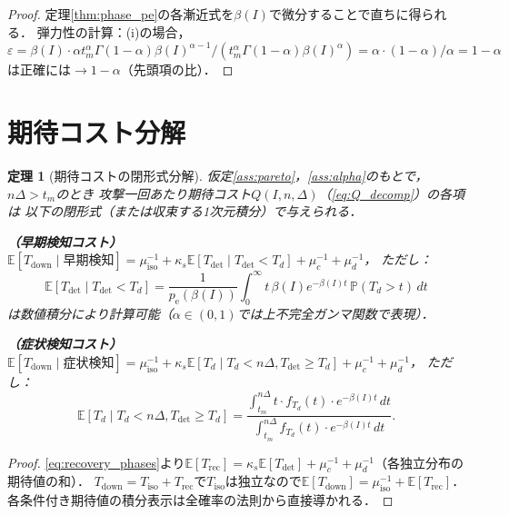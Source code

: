 \documentclass[12pt,a4paper]{article}
\theoremstyle{plain}
\newtheorem{theorem}{定理}[section]
\theoremstyle{definition}
\theoremstyle{remark}
\newcommand{\E}{\mathbb{E}}
\newcommand{\Prob}{\mathbb{P}}
\newcommand{\pe}{p_{\mathrm{e}}}
\newcommand{\Tdet}{T_{\mathrm{det}}}
\newcommand{\Trec}{T_{\mathrm{rec}}}
\newcommand{\Tdown}{T_{\mathrm{down}}}
\newcommand{\betaI}{\beta(I)}
\begin{document}
\begin{proof}
定理\ref{thm:phase_pe}の各漸近式を$\betaI$で微分することで直ちに得られる．
弾力性の計算：(i)の場合，
$\varepsilon=\betaI\cdot\alpha t_m^\alpha\Gamma(1-\alpha)\betaI^{\alpha-1}/(t_m^\alpha\Gamma(1-\alpha)\betaI^\alpha)=\alpha\cdot(1-\alpha)/\alpha=1-\alpha$
は正確には$\to1-\alpha$（先頭項の比）．
\end{proof}

\section{期待コスト分解}
\label{sec:cost}

\begin{theorem}[期待コストの閉形式分解]\label{thm:cost_decomp}
仮定\ref{ass:pareto}，\ref{ass:alpha}のもとで，$n\Delta>t_m$のとき
攻撃一回あたり期待コスト$Q(I,n,\Delta)$（\eqref{eq:Q_decomp}）の各項は
以下の閉形式（または収束する1次元積分）で与えられる．

\noindent\textbf{（早期検知コスト）}
$\E[\Tdown\mid\text{早期検知}]=\mu_{\mathrm{iso}}^{-1}+\kappa_s\E[\Tdet\mid\Tdet<T_d]+\mu_c^{-1}+\mu_d^{-1}$，
ただし：
\begin{equation}\label{eq:E_det_cond}
  \E[\Tdet\mid\Tdet<T_d]
  = \frac{1}{\pe(\betaI)}\int_0^\infty t\,\betaI e^{-\betaI t}\,\Prob(T_d>t)\,dt
\end{equation}
は数値積分により計算可能（$\alpha\in(0,1)$では上不完全ガンマ関数で表現）．

\noindent\textbf{（症状検知コスト）}
$\E[\Tdown\mid\text{症状検知}]=\mu_{\mathrm{iso}}^{-1}+\kappa_s\E[T_d\mid T_d<n\Delta,\Tdet\ge T_d]+\mu_c^{-1}+\mu_d^{-1}$，
ただし：
\begin{equation}\label{eq:E_Td_cond}
  \E[T_d\mid T_d<n\Delta,\Tdet\ge T_d]
  =\frac{\int_{t_m}^{n\Delta}t\cdot f_{T_d}(t)\cdot e^{-\betaI t}\,dt}
        {\int_{t_m}^{n\Delta}f_{T_d}(t)\cdot e^{-\betaI t}\,dt}.
\end{equation}
\end{theorem}

\begin{proof}
\eqref{eq:recovery_phases}より$\E[\Trec]=\kappa_s\E[\Tdet]+\mu_c^{-1}+\mu_d^{-1}$（各独立分布の期待値の和）．
$\Tdown=T_{\mathrm{iso}}+\Trec$で$T_{\mathrm{iso}}$は独立なので$\E[\Tdown]=\mu_{\mathrm{iso}}^{-1}+\E[\Trec]$．
各条件付き期待値の積分表示は全確率の法則から直接導かれる．
\end{proof}
\end{document}

